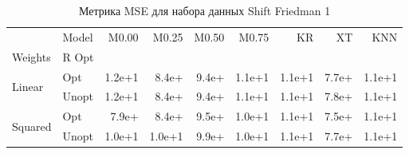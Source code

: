 \begin{table}
\caption{Метрика MSE для набора данных Shift Friedman 1}
\label{tab:MSE_Shift Friedman 1}
\begin{tabular}{llrrrrrrr}
\toprule
 & Model & M0.00 & M0.25 & M0.50 & M0.75 & KR & XT & KNN \\
Weights & R Opt &  &  &  &  &  &  &  \\
\midrule
\multirow[t]{2}{*}{Linear} & Opt & 1.2e+1 & 8.4e+ & 9.4e+ & 1.1e+1 & 1.1e+1 & 7.7e+ & 1.1e+1 \\
 & Unopt & 1.2e+1 & 8.4e+ & 9.4e+ & 1.1e+1 & 1.1e+1 & 7.8e+ & 1.1e+1 \\

\multirow[t]{2}{*}{Squared} & Opt & 7.9e+ & 8.4e+ & 9.5e+ & 1.0e+1 & 1.1e+1 & 7.5e+ & 1.1e+1 \\
 & Unopt & 1.0e+1 & 1.0e+1 & 9.9e+ & 1.0e+1 & 1.1e+1 & 7.7e+ & 1.1e+1 \\

\bottomrule
\end{tabular}
\end{table}
